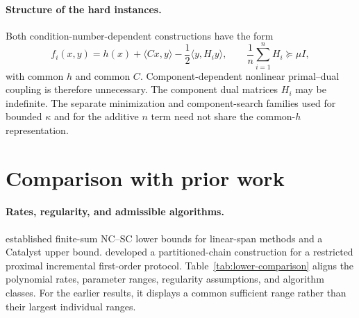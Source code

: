 \documentclass[11pt,letterpaper]{article}
\theoremstyle{definition}
\theoremstyle{remark}
\begin{document}
\paragraph{Structure of the hard instances.}
Both condition-number-dependent constructions have the form
\begin{equation}
 f_i(x,y)=h(x)+\langle Cx,y\rangle-\frac12\langle y,H_i y\rangle,
 \qquad \frac1n\sum_{i=1}^n H_i\succeq\mu I,
 \label{eq:bilinear-structure}
\end{equation}
with common $h$ and common $C$. Component-dependent nonlinear
primal--dual coupling is therefore unnecessary. The component dual matrices
$H_i$ may be indefinite. The separate minimization and component-search
families used for bounded $\kappa$ and for the additive $n$ term need not
share the common-$h$ representation.

\section{Comparison with prior work}
\label{sec:related}

\paragraph{Rates, regularity, and admissible algorithms.}
\citet{zhang2021} established finite-sum NC--SC lower bounds for linear-span
methods and a Catalyst upper bound. \citet{han2024} developed a
partitioned-chain construction for a restricted proximal incremental
first-order protocol. Table~\ref{tab:lower-comparison} aligns the polynomial
rates, parameter ranges, regularity assumptions, and algorithm classes.
For the earlier results, it displays a common sufficient range rather than
their largest individual ranges.
\end{document}
